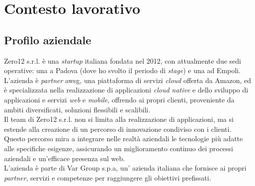 

\chapter{Contesto lavorativo}
\label{cap:introduzione}
\section{Profilo aziendale}
Zero12 s.r.l. è una \textit{startup} italiana fondata nel 2012, con attualmente due sedi operative: una a Padova (dove ho svolto il periodo di \textit{stage}) e una ad Empoli. 
L'azienda è \textit{partner} \gls{awsg}, una piattaforma di servizi \textit{cloud} offerta da Amazon, ed è specializzata nella realizzazione di applicazioni \textit{cloud native} e dello sviluppo di applicazioni e servizi \textit{web} e \textit{mobile}, offrendo ai propri clienti, proveniente da ambiti diversificati, soluzioni flessibili e scalibili.\\
Il team di Zero12 s.r.l. non si limita alla realizzazione di applicazioni, ma si estende alla creazione di un percorso di innovazione condiviso con i clienti. Questo percorso mira a integrare nelle realtà aziendali le tecnologie più adatte alle specifiche esigenze, assicurando un miglioramento continuo dei processi aziendali e un’efficace presenza sul web.\\
L'azienda è parte di Var Group s.p.a, un' azienda italiana che fornisce ai propri \textit{partner}, servizi e competenze per raggiungere gli obiettivi prefissati.
